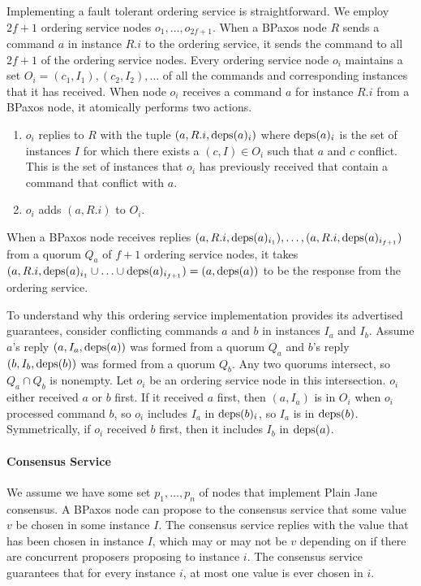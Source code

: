 \documentclass{mwhittaker}
\begin{document}
Implementing a fault tolerant ordering service is straightforward. We employ
$2f + 1$ ordering service nodes $o_{1}, \ldots, o_{2f + 1}$. When a BPaxos node
$R$ sends a command $a$ in instance $R.i$ to the ordering service, it sends the
command to all $2f + 1$ of the ordering service nodes. Every ordering service
node $o_i$ maintains a set $O_i = {(c_1, I_1), (c_2, I_2), \ldots}$ of all the
commands and corresponding instances that it has received. When node $o_i$
receives a command $a$ for instance $R.i$ from a BPaxos node, it atomically
performs two actions.
\begin{enumerate}
  \item
    $o_i$ replies to $R$ with the tuple $(a, R.i, \text{deps}(a)_i)$ where
    $\text{deps}(a)_i$ is the set of instances $I$ for which there exists a $(c, I)
    \in O_i$ such that $a$ and $c$ conflict. This is the set of instances that
    $o_i$ has previously received that contain a command that conflict with
    $a$.

  \item
    $o_i$ adds $(a, R.i)$ to $O_i$.
\end{enumerate}

When a BPaxos node receives replies $(a, R.i, \text{deps}(a)_{i_1}), \ldots, (a, R.i,
\text{deps}(a)_{i_{f+1}})$ from a quorum $Q_a$ of $f + 1$ ordering service nodes, it
takes $(a, R.i, \text{deps}(a)_{i_1} \cup \ldots \cup \text{deps}(a)_{i_{f+1}}) = (a,
\text{deps}(a))$ to be the response from the ordering service.

To understand why this ordering service implementation provides its advertised
guarantees, consider conflicting commands $a$ and $b$ in instances $I_a$ and
$I_b$. Assume $a$'s reply $(a, I_a, \text{deps}(a))$ was formed from a quorum $Q_a$
and $b$'s reply $(b, I_b, \text{deps}(b))$ was formed from a quorum $Q_b$. Any two
quorums intersect, so $Q_a \cap Q_b$ is nonempty. Let $o_i$ be an ordering
service node in this intersection. $o_i$ either received $a$ or $b$ first. If
it received $a$ first, then $(a, I_a)$ is in $O_i$ when $o_i$ processed command
$b$, so $o_i$ includes $I_a$ in $\text{deps}(b)_i$, so $I_a$ is in $\text{deps}(b)$.
Symmetrically, if $o_i$ received $b$ first, then it includes $I_b$ in
$\text{deps}(a)$.

\paragraph{Consensus Service}
We assume we have some set $p_1, \ldots, p_n$ of nodes that implement Plain
Jane consensus. A BPaxos node can propose to the consensus service that some
value $v$ be chosen in some instance $I$. The consensus service replies with
the value that has been chosen in instance $I$, which may or may not be $v$
depending on if there are concurrent proposers proposing to instance $i$. The
consensus service guarantees that for every instance $i$, at most one value is
ever chosen in $i$.
\end{document}
